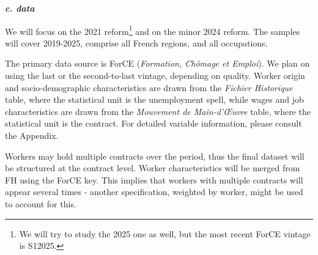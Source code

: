 \documentclass[10pt, a4paper]{article}
\begin{document}
\textbf{\textit{\textit{c. data}}}

We will focus on the 2021 reform\footnote{We will try to study the 2025 one as well, but the most recent ForCE vintage is S12025.} and on the minor 2024 reform. The samples will cover 2019-2025, comprise all French regions, and all occupations. 

The primary data source is ForCE (\textit{Formation, Ch\^omage et Emploi}). We plan on using the last or the second-to-last vintage, depending on quality. Worker origin and socio-demographic characteristics are drawn from the \textit{Fichier Historique} table, where the statistical unit is the unemployment spell, while wages and job characteristics are drawn from the \textit{Mouvement de Main-d'\OE uvre} table, where the statistical unit is the contract. For detailed variable information, please consult the Appendix.

Workers may hold multiple contracts over the period, thus the final dataset will be structured at the contract level. Worker characteristics will be merged from FH using the ForCE key. This implies that workers with multiple contracts will appear several times - another specification, weighted by worker, might be used to account for this. 
\end{document}
